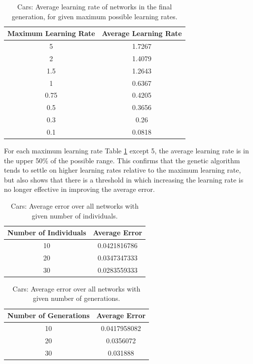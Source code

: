 \documentclass[10pt, conference, compsocconf]{IEEEtran}
\begin{document}
\begin{table}
\caption{Cars: Average learning rate of networks in the final generation, for given maximum possible learning rates.}
\label{tbl:CarsAverageLearningRates}
\centering
\begin{tabular}{c c}
\hline
Maximum Learning Rate & Average Learning Rate \\
\hline
5 & 1.7267 \\
2 & 1.4079 \\
1.5 & 1.2643 \\
1 & 0.6367 \\
0.75 & 0.4205 \\
0.5 & 0.3656 \\
0.3 & 0.26 \\
0.1 & 0.0818 \\
\hline
\end{tabular}
\end{table}

For each maximum learning rate Table \ref{tbl:CarsAverageLearningRates} except 5, the average learning rate is in the upper 50\% of the possible range. This confirms that the genetic algorithm tends to settle on higher learning rates relative to the maximum learning rate, but also shows that there is a threshold in which increasing the learning rate is no longer effective in improving the average error.

\begin{table}
\caption{Cars: Average error over all networks with given number of individuals.}
\label{tbl:CarsIndividuals}
\centering
\begin{tabular}{c c}
\hline
Number of Individuals & Average Error \\
\hline
10 & 0.0421816786 \\
20 & 0.0347347333 \\
30 & 0.0283559333 \\
\hline
\end{tabular}
\end{table}

\begin{table}
\caption{Cars: Average error over all networks with given number of generations.}
\label{tbl:CarsGenerations}
\centering
\begin{tabular}{c c}
\hline
Number of Generations & Average Error \\
\hline
10 & 0.0417958082 \\
20 & 0.0356072 \\
30 & 0.031888 \\
\hline
\end{tabular}
\end{table}
\end{document}
